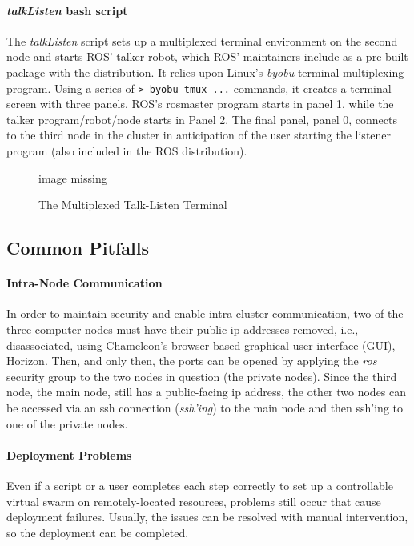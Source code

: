 \documentclass[9pt,twocolumn,twoside]{../../styles/osajnl}
\begin{document}
\paragraph{\textit{talkListen} bash script}
The \textit{talkListen} script sets up a multiplexed terminal environment on the second node and starts ROS' talker robot, which ROS' maintainers include as a pre-built package with the distribution.  It relies upon Linux's \textit{byobu} terminal multiplexing program.  Using a series of {\color{green} \lstinline[style=BashInputStyle]!> byobu-tmux ...! } commands, it creates a terminal screen with three panels.  ROS's rosmaster program starts in panel 1, while the talker program/robot/node starts in Panel 2.  The final panel, panel 0, connects to the third node in the cluster in anticipation of the user starting the listener program (also included in the ROS distribution).

\begin{figure}[htbp]
\centering
image missing
\caption{The Multiplexed Talk-Listen Terminal}
\label{fig:byobu}
\end{figure}

\subsection{Common Pitfalls}
\paragraph{Intra-Node Communication}
In order to maintain security and enable intra-cluster communication, two of the three computer nodes must have their public ip addresses removed, i.e., disassociated, using Chameleon's browser-based graphical user interface (GUI), Horizon.  Then, and only then, the ports can be opened by applying the \textit{ros} security group to the two nodes in question (the private nodes).  Since the third node, the main node, still has a public-facing ip address, the other two nodes can be accessed via an ssh connection (\textit{ssh'ing}) to the main node and then ssh'ing to one of the private nodes.

\paragraph{Deployment Problems}
Even if a script or a user completes each step correctly to set up a controllable virtual swarm on remotely-located resources, problems still occur that cause deployment failures.  Usually, the issues can be resolved with manual intervention, so the deployment can be completed.  
\end{document}
